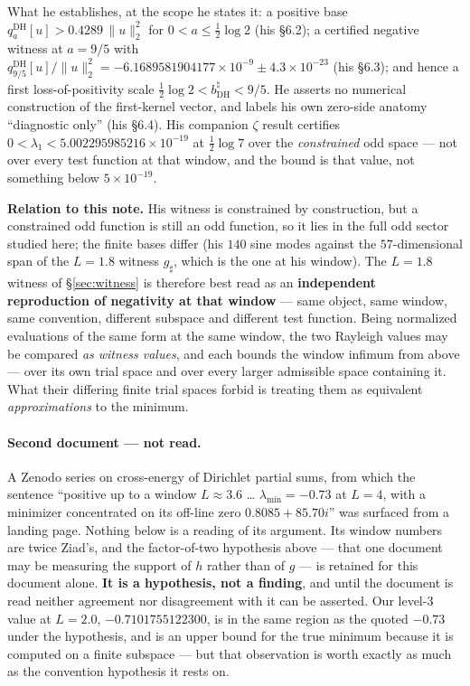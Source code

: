 \documentclass[11pt,a4paper]{article}
\theoremstyle{definition}
\theoremstyle{remark}
\begin{document}
What he establishes, at the scope he states it: a positive base
$q^{\mathrm{DH}}_a[u] > 0.4289\,\|u\|_2^2$ for $0 < a \le \tfrac12\log 2$ (his \S6.2); a
certified negative witness at $a = 9/5$ with
$q^{\mathrm{DH}}_{9/5}[u]/\|u\|_2^2 = -6.1689581904177\times10^{-9} \pm 4.3\times10^{-23}$
(his \S6.3); and hence a first loss-of-positivity scale
$\tfrac12\log 2 < b^{\natural}_{\mathrm{DH}} < 9/5$. He asserts no numerical construction
of the first-kernel vector, and labels his own zero-side anatomy ``diagnostic only''
(his \S6.4). His companion $\zeta$ result certifies
$0 < \lambda_1 < 5.002295985216\times10^{-19}$ at $\tfrac12\log 7$ over the
\emph{constrained} odd space --- not over every test function at that window, and the
bound is that value, not something below $5\times10^{-19}$.

\textbf{Relation to this note.} His witness is constrained by construction, but a
constrained odd function is still an odd function, so it lies in the full odd sector
studied here; the finite bases differ (his $140$ sine modes against the $57$-dimensional
span of the $L = 1.8$ witness $g_\sharp$, which is the one at his window). The $L = 1.8$ witness of \S\ref{sec:witness} is
therefore best read as an \textbf{independent reproduction of negativity at that window}
--- same object, same window, same convention, different subspace and different test
function. Being normalized evaluations of the same form at the same window, the two
Rayleigh values may be compared \emph{as witness values}, and each bounds the window
infimum from above --- over its own trial space and over every larger admissible space
containing it. What their differing finite trial spaces forbid is treating them as
equivalent \emph{approximations} to the minimum.

\paragraph{Second document --- not read.} A Zenodo series on cross-energy of Dirichlet
partial sums, from which the sentence ``positive up to a window $L \approx 3.6$ \ldots
$\lambda_{\min} = -0.73$ at $L=4$, with a minimizer concentrated on its off-line zero
$0.8085+85.70i$'' was surfaced from a landing page. Nothing below is a reading of its
argument. Its window numbers are twice Ziad's, and the factor-of-two hypothesis above ---
that one document may be measuring the support of $h$ rather than of $g$ --- is retained
for this document alone. \textbf{It is a hypothesis, not a finding}, and until the
document is read neither agreement nor disagreement with it can be asserted. Our level-$3$ value at $L=2.0$,
$-0.7101755122300$, is in the same region as the quoted $-0.73$ under the hypothesis, and
is an upper bound for the true minimum because it is computed on a finite subspace --- but
that observation is worth exactly as much as the convention hypothesis it rests on.
\end{document}
